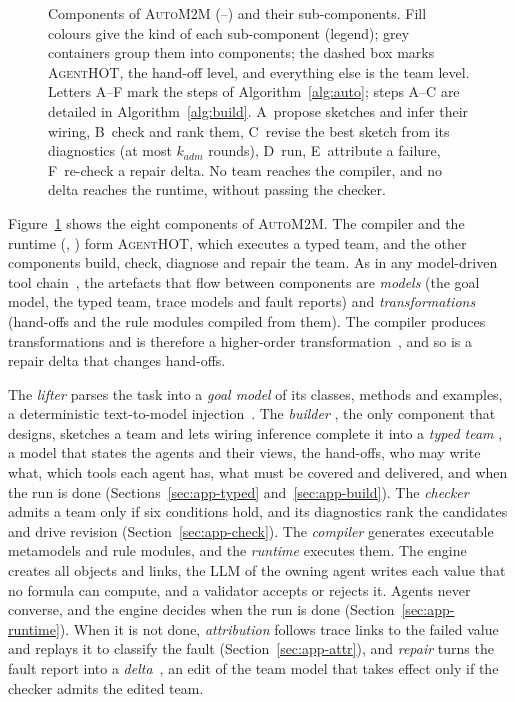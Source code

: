 \documentclass[pdflatex,sn-mathphys-num]{sn-jnl}
\theoremstyle{thmstyleone}%
\theoremstyle{thmstyletwo}%
\theoremstyle{thmstylethree}%
\newcommand{\tool}{\textsc{AgentHOT}}
\newcommand{\auto}{\textsc{AutoM2M}}
\begin{document}
\begin{figure}[t]
\caption{Components of \auto{} (--) and their
sub-components. Fill colours give the kind of each sub-component (legend);
grey containers group them into components; the dashed box marks \tool{}, the
hand-off level, and everything else is the team level. Letters A--F mark the
steps of Algorithm~\ref{alg:auto}; steps A--C are detailed in
Algorithm~\ref{alg:build}. A~propose sketches and infer their wiring, B~check
and rank them, C~revise the best sketch from its diagnostics (at most
$k_{\mathit{adm}}$ rounds), D~run, E~attribute a failure, F~re-check a repair
delta. No team reaches the compiler, and no delta reaches the runtime, without
passing the checker.}
\label{fig:pipeline}
\end{figure}

Figure~\ref{fig:pipeline} shows the eight components of \auto{}. The compiler
and the runtime (, ) form \tool{}, which executes a typed
team, and the other components build, check, diagnose and repair the team. As
in any model-driven tool chain~\cite{bezivin2005unification,brambilla2017mdse},
the artefacts that flow between components are \emph{models} (the goal model,
the typed team, trace models and fault reports) and \emph{transformations}
(hand-offs and the rule modules compiled from them). The compiler produces
transformations and is therefore a higher-order
transformation~\cite{tisi2009hot}, and so is a repair delta that changes
hand-offs.

The \emph{lifter}  parses the task into a \emph{goal model} of its
classes, methods and examples, a deterministic text-to-model
injection~\cite{brambilla2017mdse,bruneliere2014modisco}. The \emph{builder}
, the only component that designs, sketches a team and lets wiring
inference complete it into a \emph{typed team} , a model that states
the agents and their views, the hand-offs, who may write what, which tools each
agent has, what must be covered and delivered, and when the run is done
(Sections~\ref{sec:app-typed} and~\ref{sec:app-build}). The \emph{checker}
 admits a team only if six conditions hold, and its diagnostics rank
the candidates and drive revision (Section~\ref{sec:app-check}). The
\emph{compiler}  generates executable metamodels and rule modules,
and the \emph{runtime}  executes them. The engine creates all objects
and links, the LLM of the owning agent writes each value that no formula can
compute, and a validator accepts or rejects it. Agents never converse, and the
engine decides when the run is done (Section~\ref{sec:app-runtime}). When it is
not done, \emph{attribution}  follows trace links to the failed value
and replays it to classify the fault (Section~\ref{sec:app-attr}), and
\emph{repair}  turns the fault report into a
\emph{delta}~\cite{kehrer2011lifting,tinnes2025evolution}, an edit of the team
model that takes effect only if the checker admits the edited team.
\end{document}
